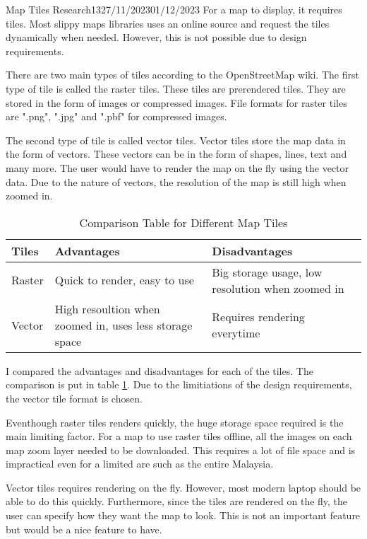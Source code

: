\documentclass[12pt]{article}
\begin{document}
\begin{logbook-entry}{Map Tiles Research}{13}{27/11/2023}{01/12/2023}
For a map to display, it requires tiles.
Most slippy maps libraries uses an online source and request the tiles dynamically when needed.
However, this is not possible due to design requirements.

There are two main types of tiles according to the OpenStreetMap wiki.
The first type of tile is called the raster tiles.
These tiles are prerendered tiles.
They are stored in the form of images or compressed images.
File formats for raster tiles are ".png", ".jpg" and ".pbf" for compressed images.

The second type of tile is called vector tiles.
Vector tiles store the map data in the form of vectors.
These vectors can be in the form of shapes, lines, text and many more.
The user would have to render the map on the fly using the vector data.
Due to the nature of vectors, the resolution of the map is still high when zoomed in.

\begin{table}[H]
    \centering{}
    \caption{Comparison Table for Different Map Tiles}
    \label{tab:map-tiles-table}
    \begin{tabularx}{\textwidth}{l X X}
        \hline
        Tiles & Advantages & Disadvantages\\
        \hline
        Raster & Quick to render, easy to use & Big storage usage, low resolution when zoomed in\\
        Vector & High resoultion when zoomed in, uses less storage space & Requires rendering everytime\\
        \hline
    \end{tabularx}
\end{table}

I compared the advantages and disadvantages for each of the tiles.
The comparison is put in table \ref{tab:map-tiles-table}.
Due to the limitiations of the design requirements, the vector tile format is chosen.

Eventhough raster tiles renders quickly, the huge storage space required is the main limiting factor.
For a map to use raster tiles offline, all the images on each map zoom layer needed to be downloaded.
This requires a lot of file space and is impractical even for a limited are such as the entire Malaysia.

Vector tiles requires rendering on the fly.
However, most modern laptop should be able to do this quickly.
Furthermore, since the tiles are rendered on the fly, the user can specify how they want the map to look.
This is not an important feature but would be a nice feature to have.


\end{logbook-entry}
\end{document}
